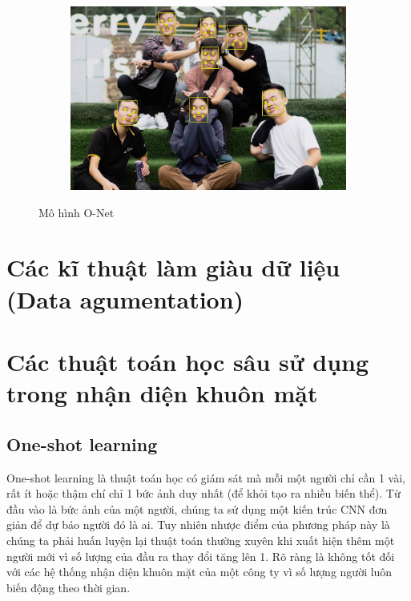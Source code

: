 \begin{figure}
    \begin{subfigure}{1.\textwidth}
        \begin{center}
            \includegraphics[width=1.\linewidth]{Chapters/items/chap2_14.jpg}
        \end{center}
        \label{fig:chap2_14}
    \end{subfigure}
    \caption{Mô hình O-Net}
\end{figure}

\newpage
\section{Các kĩ thuật làm giàu dữ liệu (Data agumentation)}
\newpage
\section{Các thuật toán học sâu sử dụng trong nhận diện khuôn mặt}
\subsection{One-shot learning}

One-shot learning là thuật toán học có giám sát mà mỗi một người chỉ cần 1 vài,
rất ít hoặc thậm chí chỉ 1 bức ảnh duy nhất (để khỏi tạo ra nhiều biến thể).
Từ đầu vào là bức ảnh của một người, chúng ta sử dụng một kiến trúc CNN
đơn giản để dự báo người đó là ai.
Tuy nhiên nhược điểm của phương pháp này là chúng ta phải huấn luyện lại thuật
toán thường xuyên khi xuất hiện thêm một người mới vì số lượng của đầu ra thay đổi tăng lên 1.
Rõ ràng là không tốt đối với các hệ thống nhận diện khuôn mặt của một công ty vì số lượng người luôn biến động theo thời gian.

